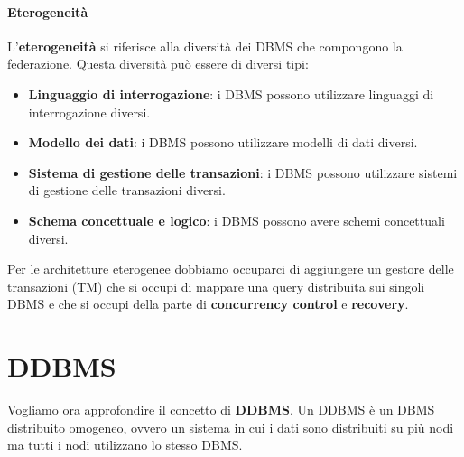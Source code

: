 \paragraph{Eterogeneità} L'\textbf{eterogeneità} si riferisce alla diversità dei DBMS
che compongono la federazione. Questa diversità può essere di diversi tipi:
\begin{itemize}
      \item \textbf{Linguaggio di interrogazione}: i DBMS possono utilizzare
            linguaggi di interrogazione diversi.
      \item \textbf{Modello dei dati}: i DBMS possono utilizzare modelli di dati
            diversi.
      \item \textbf{Sistema di gestione delle transazioni}: i DBMS possono utilizzare
            sistemi di gestione delle transazioni diversi.
      \item \textbf{Schema concettuale e logico}: i DBMS possono avere schemi
            concettuali diversi.
\end{itemize}

Per le architetture eterogenee dobbiamo occuparci di aggiungere un gestore delle
transazioni (TM) che si occupi di mappare una query distribuita sui singoli DBMS
e che si occupi della parte di \textbf{concurrency control} e \textbf{recovery}.
\section{DDBMS}
Vogliamo ora approfondire il concetto di \textbf{DDBMS}. Un DDBMS è un DBMS
distribuito omogeneo, ovvero un sistema in cui i dati sono distribuiti su più
nodi ma tutti i nodi utilizzano lo stesso DBMS.

